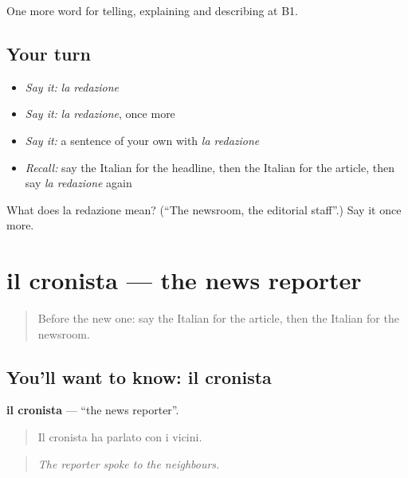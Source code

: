 \begin{grammarlens}[title={What you've built}]
One more word for telling, explaining and describing at B1.
\end{grammarlens}

\subsection*{Your turn}
\begin{itemize}
\raggedright
  \item \emph{Say it:} \emph{la redazione}
  \item \emph{Say it:} \emph{la redazione}, once more
  \item \emph{Say it:} a sentence of your own with \emph{la redazione}
  \item \emph{Recall:} say the Italian for the headline, then the Italian for the article, then say \emph{la redazione} again
\end{itemize}

\begin{tcolorbox}[breakable,colback=teal!4,colframe=teal!35!black,title={Before you move on}]
What does la redazione mean? (\textquotedblleft{}The newsroom, the editorial staff\textquotedblright{}.) Say it once more.
\end{tcolorbox}
\section[il cronista]{il cronista — the news reporter}

\label{lesson:IT-C283-cronista}



\begin{quote}
Before the new one: say the Italian for the article, then the Italian for the newsroom.
\end{quote}

\subsection*{You'll want to know: il cronista}
\textbf{il cronista} — \textquotedblleft{}the news reporter\textquotedblright{}.

\begin{quote}
Il cronista ha parlato con i vicini.
\end{quote}

\begin{quote}
\emph{The reporter spoke to the neighbours.}
\end{quote}

